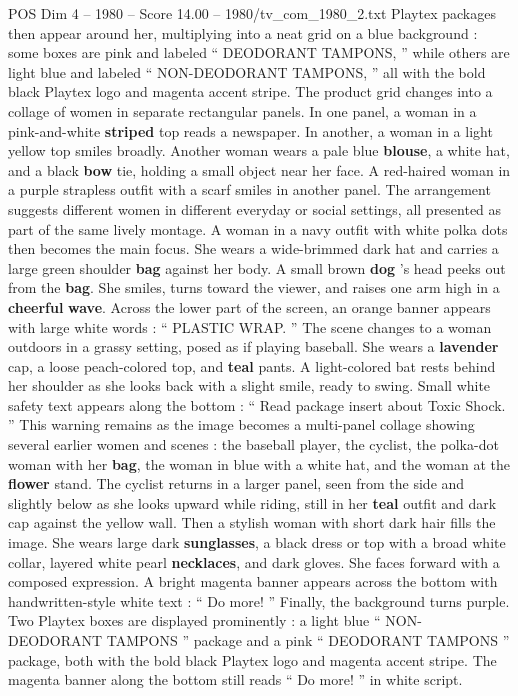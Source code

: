 \begin{textsample}{POS Dim 4 – 1980 – Score 14.00 – 1980/tv\_com\_1980\_2.txt}
Playtex packages then appear around her, multiplying into a neat grid on a blue background : some boxes are pink and labeled “ DEODORANT TAMPONS, ” while others are light blue and labeled “ NON-DEODORANT TAMPONS, ” all with the bold black Playtex logo and magenta accent stripe.
The product grid changes into a collage of women in separate rectangular panels.
In one panel, a woman in a pink-and-white \textbf{striped} top reads a newspaper.
In another, a woman in a light yellow top smiles broadly.
Another woman wears a pale blue \textbf{blouse}, a white hat, and a black \textbf{bow} tie, holding a small object near her face.
A red-haired woman in a purple strapless outfit with a scarf smiles in another panel.
The arrangement suggests different women in different everyday or social settings, all presented as part of the same lively montage.
A woman in a navy outfit with white polka dots then becomes the main focus.
She wears a wide-brimmed dark hat and carries a large green shoulder \textbf{bag} against her body.
A small brown \textbf{dog} ’s head peeks out from the \textbf{bag}.
She smiles, turns toward the viewer, and raises one arm high in a \textbf{cheerful} \textbf{wave}.
Across the lower part of the screen, an orange banner appears with large white words : “ PLASTIC WRAP. ” The scene changes to a woman outdoors in a grassy setting, posed as if playing baseball.
She wears a \textbf{lavender} cap, a loose peach-colored top, and \textbf{teal} pants.
A light-colored bat rests behind her shoulder as she looks back with a slight smile, ready to swing.
Small white safety text appears along the bottom : “ Read package insert about Toxic Shock. ” This warning remains as the image becomes a multi-panel collage showing several earlier women and scenes : the baseball player, the cyclist, the polka-dot woman with her \textbf{bag}, the woman in blue with a white hat, and the woman at the \textbf{flower} stand.
The cyclist returns in a larger panel, seen from the side and slightly below as she looks upward while riding, still in her \textbf{teal} outfit and dark cap against the yellow wall.
Then a stylish woman with short dark hair fills the image.
She wears large dark \textbf{sunglasses}, a black dress or top with a broad white collar, layered white pearl \textbf{necklaces}, and dark gloves.
She faces forward with a composed expression.
A bright magenta banner appears across the bottom with handwritten-style white text : “ Do more! ” Finally, the background turns purple.
Two Playtex boxes are displayed prominently : a light blue “ NON-DEODORANT TAMPONS ” package and a pink “ DEODORANT TAMPONS ” package, both with the bold black Playtex logo and magenta accent stripe.
The magenta banner along the bottom still reads “ Do more! ” in white script.

\end{textsample}
